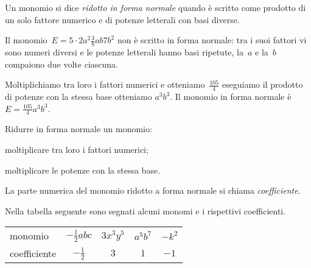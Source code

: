 \begin{definizione}
Un monomio si dice \emph{ridotto in forma normale} quando è scritto come prodotto di un solo fattore
numerico e di potenze letterali con basi diverse.
\end{definizione}

\begin{exrig}
 \begin{esempio}
Il monomio~$E=5\cdot 2a^{2}\frac{3}{8}ab7b^{2}$ non è scritto in
forma normale: tra i suoi fattori vi sono numeri diversi e le potenze
letterali hanno basi ripetute, la~$a$ e la~$b$ compaiono due volte ciascuna.

Moltiplichiamo tra loro i fattori numerici e otteniamo~$\frac{105}{4}$ eseguiamo il prodotto di potenze con la stessa base otteniamo
$a^{3}b^{3}$. Il monomio in forma normale è~$E=\frac{105}{4}a^{3}b^{3}$.
 \end{esempio}
\end{exrig}

\begin{procedura}
 Ridurre in forma normale un monomio:
 \begin{enumeratea}
 \item moltiplicare tra loro i fattori numerici;
 \item moltiplicare le potenze con la stessa base.
 \end{enumeratea}
\end{procedura}


\begin{definizione}
La parte numerica del monomio ridotto a forma normale si chiama \emph{coefficiente}.
\end{definizione}

\begin{exrig}
 \begin{esempio}
 Nella tabella seguente sono segnati alcuni monomi e i rispettivi coefficienti.
\begin{center}
 \begin{tabular}{lcccc}
 \toprule
 monomio & $-{\frac{1}{2}}abc$ & $3x^{3}y^{5}$ & $a^{5}b^{7}$ & $-k^{2}$\\
coefficiente & $-{\frac{1}{2}}$ & $3$ & $1$ & $-1$ \\
 \bottomrule
\end{tabular}
\end{center}
 \end{esempio}
\end{exrig}

